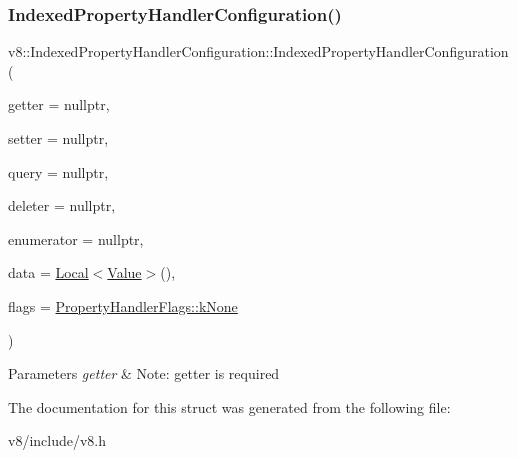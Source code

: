 \subsubsection{\texorpdfstring{Indexed\+Property\+Handler\+Configuration()}{IndexedPropertyHandlerConfiguration()}}
{\footnotesize\ttfamily v8\+::\+Indexed\+Property\+Handler\+Configuration\+::\+Indexed\+Property\+Handler\+Configuration (\begin{DoxyParamCaption}\item[{\mbox{\hyperlink{namespacev8_a48e7816ba64447bf32a25d194588daaf}{Indexed\+Property\+Getter\+Callback}}}]{getter = {\ttfamily nullptr},  }\item[{\mbox{\hyperlink{namespacev8_a4ac7cc6185ebc8b6a199f9fa8e6bf5c3}{Indexed\+Property\+Setter\+Callback}}}]{setter = {\ttfamily nullptr},  }\item[{\mbox{\hyperlink{namespacev8_a980b62c33eb664783e61e25c3b27f9ee}{Indexed\+Property\+Query\+Callback}}}]{query = {\ttfamily nullptr},  }\item[{\mbox{\hyperlink{namespacev8_a53863728de14cde48dd6543207b2f2da}{Indexed\+Property\+Deleter\+Callback}}}]{deleter = {\ttfamily nullptr},  }\item[{\mbox{\hyperlink{namespacev8_adbb0a6d5537371953f9ba807d4f6275e}{Indexed\+Property\+Enumerator\+Callback}}}]{enumerator = {\ttfamily nullptr},  }\item[{\mbox{\hyperlink{classv8_1_1Local}{Local}}$<$ \mbox{\hyperlink{classv8_1_1Value}{Value}} $>$}]{data = {\ttfamily \mbox{\hyperlink{classv8_1_1Local}{Local}}$<$\mbox{\hyperlink{classv8_1_1Value}{Value}}$>$()},  }\item[{\mbox{\hyperlink{namespacev8_af4789f0aeb8680e353901a35810cac1a}{Property\+Handler\+Flags}}}]{flags = {\ttfamily \mbox{\hyperlink{namespacev8_af4789f0aeb8680e353901a35810cac1aa35c3ace1970663a16e5c65baa5941b13}{Property\+Handler\+Flags\+::k\+None}}} }\end{DoxyParamCaption})\hspace{0.3cm}{\ttfamily [inline]}}


\begin{DoxyParams}{Parameters}
{\em getter} & Note\+: getter is required \\
\hline
\end{DoxyParams}


The documentation for this struct was generated from the following file\+:\begin{DoxyCompactItemize}
\item 
v8/include/v8.\+h\end{DoxyCompactItemize}
